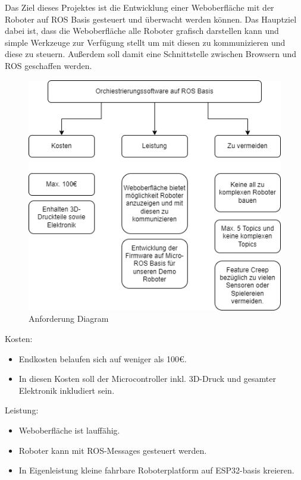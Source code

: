 \begin{flushleft}
    Das Ziel dieses Projektes ist die Entwicklung einer Weboberfläche mit der Roboter auf ROS Basis gesteuert und überwacht werden können.
    Das Hauptziel dabei ist, dass die Weboberfläche alle Roboter grafisch darstellen kann und simple Werkzeuge zur Verfügung stellt um mit diesen zu kommunizieren
    und diese zu steuern.
    Außerdem soll damit eine Schnittstelle zwischen Browsern und ROS geschaffen werden.

    

    \begin{figure}[h!]
        \centering
        \includegraphics[width=1\textwidth]{imgs/Zielsetzung.png}
        \caption{Anforderung Diagram}
        \label{fig:dia_anforderung}%
    \end{figure}

    Kosten:
    \begin{itemize}
    \item Endkosten belaufen sich auf weniger als 100€.
    \item In diesen Kosten soll der Microcontroller inkl. 3D-Druck und gesamter Elektronik inkludiert sein.
    \end{itemize}

    Leistung:
    \begin{itemize}
    \item Weboberfläche ist lauffähig.
    \item Roboter kann mit ROS-Messages gesteuert werden.
    \item In Eigenleistung kleine fahrbare Roboterplatform auf ESP32-basis kreieren.
    \end{itemize}
        

\end{flushleft}

